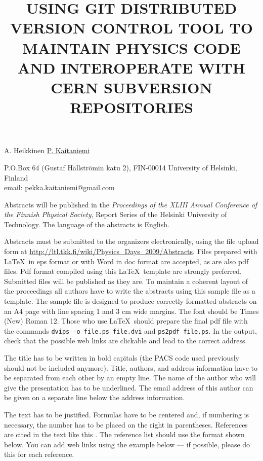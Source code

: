\documentclass[12pt]{article}
\begin{document}
\title{USING GIT DISTRIBUTED VERSION CONTROL TOOL TO MAINTAIN PHYSICS
  CODE AND INTEROPERATE WITH CERN SUBVERSION REPOSITORIES}

A. Heikkinen \underline{P. Kaitaniemi}

P.O.Box 64 (Gustaf H\"allstr\"omin katu 2), FIN-00014 University of Helsinki, Finland\\
email: pekka.kaitaniemi@gmail.com

\vspace{\baselineskip}


Abstracts will be published in the \emph{Proceedings of the XLIII
Annual Conference of the Finnish Physical Society}, Report Series of
the Helsinki University of Technology. The language of the abstracts
is English.

Abstracts must be submitted to the organizers electronically, using
the file upload form at
\url{http://ltl.tkk.fi/wiki/Physics_Days_2009/Abstracts}. Files
prepared with \LaTeX\ in eps format or with Word in doc format are
accepted, as are also pdf files. Pdf format compiled using this
\LaTeX\ template are strongly preferred. Submitted files will be
published as they are. To maintain a coherent layout of the
proceedings all authors have to write the abstracts using this
sample file as a template. The sample file is designed to produce
correctly formatted abstracts on an A4 page with line spacing 1 and
3 cm wide margins. The font should be Times (New) Roman 12. Those
who use \LaTeX\ should prepare the final pdf file with the commands
\mbox{\tt dvips -o file.ps file.dvi} and \mbox{\tt ps2pdf file.ps}.
In the output, check that the possible web links are clickable and
lead to the correct address.

The title has to be written in bold capitals (the PACS code used
previously should not be included anymore). Title, authors, and
address information have to be separated from each other by an empty
line. The name of the author who will give the presentation has to
be underlined. The email address of this author can be given on a
separate line below the address information.

The text has to be justified. Formulas have to be centered and, if
numbering is necessary, the number has to be placed on the right in
parentheses. References are cited in the text like this \cite{ref1}.
The reference list should use the format shown below. You can add
web links using the example below --- if possible, please do this
for each reference.
\end{document}
